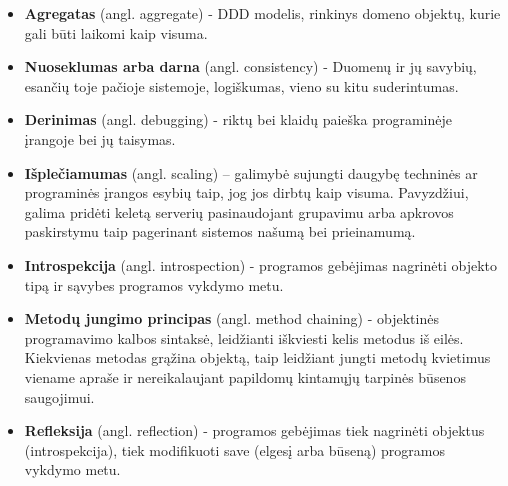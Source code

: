 \begin{itemize}

  \item \textbf{Agregatas} (angl. aggregate) - DDD modelis, rinkinys domeno objektų, kurie gali būti laikomi kaip visuma.

  \item \textbf{Nuoseklumas arba darna} (angl. consistency) - Duomenų ir jų savybių, esančių toje pačioje sistemoje, logiškumas, vieno su kitu suderintumas.

  \item \textbf{Derinimas} (angl. debugging) - riktų bei klaidų paieška programinėje įrangoje bei jų taisymas.

  \item \textbf{Išplečiamumas} (angl. scaling) – galimybė sujungti daugybę techninės ar programinės įrangos esybių taip, jog jos dirbtų kaip visuma. Pavyzdžiui, galima pridėti keletą serverių pasinaudojant grupavimu arba apkrovos paskirstymu taip pagerinant sistemos našumą bei prieinamumą.

  \item \textbf{Introspekcija} (angl. introspection) - programos gebėjimas nagrinėti objekto tipą ir sąvybes programos vykdymo metu.

  \item \textbf{Metodų jungimo principas} (angl. method chaining) - objektinės programavimo kalbos sintaksė, leidžianti iškviesti kelis metodus iš eilės. Kiekvienas metodas grąžina objektą, taip leidžiant jungti metodų kvietimus viename apraše ir nereikalaujant papildomų kintamųjų tarpinės būsenos saugojimui.

  \item \textbf{Refleksija} (angl. reflection) - programos gebėjimas tiek nagrinėti objektus (introspekcija), tiek modifikuoti save (elgesį arba būseną) programos vykdymo metu.

\end{itemize}
